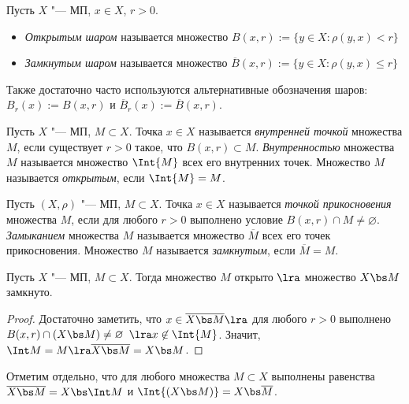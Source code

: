 \begin{definition}
	Пусть $X$ "--- МП, $x \in X$, $r > 0$.
	\begin{itemize}
		\item \textit{Открытым шаром} называется множество $B(x, r) := \{y \in X: \rho(y, x) < r\}$
		
		\item \textit{Замкнутым шаром} называется множество $\overline B(x, r) := \{y \in X: \rho(y, x) \leqslant r\}$
	\end{itemize}
\end{definition}
\begin{note}
Также достаточно часто используются альтернативные обозначения шаров: \(B_r(x):=B(x, r)\) и \(\overline B_r(x):= \overline B(x, r)\).
\end{note}

\begin{definition}
	Пусть $X$ "--- МП, $M \subset X$. Точка $x \in X$ называется \textit{внутренней точкой} множества $M$, если существует $r > 0$ такое, что $B(x, r) \subset M$. \textit{Внутренностью} множества $M$ называется множество $\Int{M}$ всех его внутренних точек. Множество $M$ называется \textit{открытым}, если $\Int{M} = M$.
\end{definition}

\begin{definition}
	Пусть $(X, \rho)$ "--- МП, $M \subset X$. Точка $x \in X$ назы\-вается \textit{точкой прикосновения} множества $M$, если для любого $r > 0$ выполнено условие $B(x, r) \cap M \neq \varnothing$. \textit{Замыканием} множества $M$ называется множество $\overline M$ всех его точек прикосновения. Множество $M$ называется \textit{замкнутым}, если $\overline M = M$.
\end{definition}

\begin{theorem}\label{thm1.1}
	Пусть $X$ "--- МП, $M \subset X$. Тогда множество $M$ открыто $\lra$ множество $X \bs M$ замкнуто.
\end{theorem}

\begin{proof}
	Достаточно заметить, что $x \in \overline{X \bs M} \lra$ для любого $r > 0$ выполнено $B(x, r) \cap (X \bs M) \neq \varnothing$ $\lra x \not\in \Int{M}$. Значит, $\Int M = M\lra \overline{X \bs M} = X \bs M$.
\end{proof}

\begin{note}
	Отметим отдельно, что для любого множества $M \subset X$ выполнены равенства $\overline{X \bs M} = X \bs \Int M$ и $\Int{(X \bs M)} = X \bs \overline M$.
\end{note}

